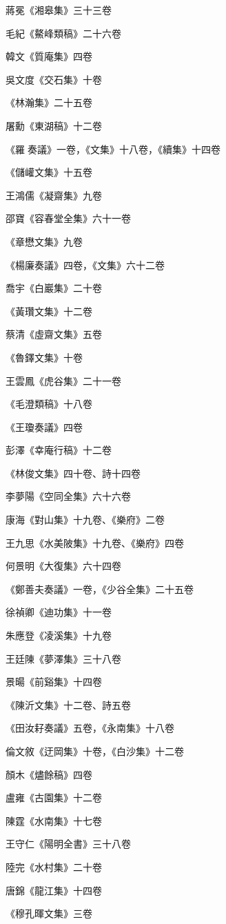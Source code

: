 蔣冕《湘皋集》三十三卷

毛紀《鰲峰類稿》二十六卷

韓文《質庵集》四卷

吳文度《交石集》十卷

《林瀚集》二十五卷

屠勳《東湖稿》十二卷

《羅奏議》一卷，《文集》十八卷，《續集》十四卷

《儲巏文集》十五卷

王鴻儒《凝齋集》九卷

邵寶《容春堂全集》六十一卷

《章懋文集》九卷

《楊廉奏議》四卷，《文集》六十二卷

喬宇《白巖集》二十卷

《黃瓚文集》十二卷

蔡清《虛齋文集》五卷

《魯鐸文集》十卷

王雲鳳《虎谷集》二十一卷

《毛澄類稿》十八卷

《王瓊奏議》四卷

彭澤《幸庵行稿》十二卷

《林俊文集》四十卷、詩十四卷

李夢陽《空同全集》六十六卷

康海《對山集》十九卷、《樂府》二卷

王九思《水美陂集》十九卷、《樂府》四卷

何景明《大復集》六十四卷

《鄭善夫奏議》一卷，《少谷全集》二十五卷

徐禎卿《迪功集》十一卷

朱應登《凌溪集》十九卷

王廷陳《夢澤集》三十八卷

景暘《前谿集》十四卷

《陳沂文集》十二卷、詩五卷

《田汝耔奏議》五卷，《永南集》十八卷

倫文敘《迂岡集》十卷，《白沙集》十二卷

顏木《燼餘稿》四卷

盧雍《古園集》十二卷

陳霆《水南集》十七卷

王守仁《陽明全書》三十八卷

陸完《水村集》二十卷

唐錦《龍江集》十四卷

《穆孔暉文集》三卷

